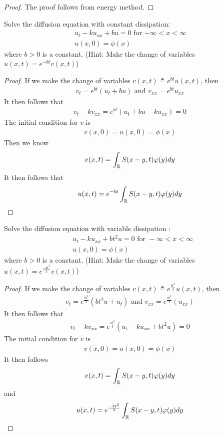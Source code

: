 \documentclass{report}
\begin{document}
\begin{proof}
The proof follows from energy method.
\end{proof}
\begin{question}{}{}
Solve the diffusion equation with constant dissipation: 
\begin{align*}
&u_t-ku_{xx}+bu=0\text{ for $-\infty < x< \infty$ } \\
&u(x,0)=\phi (x)
\end{align*}
where $b>0$ is a constant. (Hint: Make the change of variables $u(x,t)=e^{-bt}v(x,t)$)
\end{question}
\begin{proof}
If we make the change of variables $v(x,t)\triangleq e^{bt}u(x,t)$, then 
\begin{align*}
v_t=e^{bt}(u_t+bu)\text{ and }v_{xx}=e^{bt}u_{xx}
\end{align*}
It then follows that 
\begin{align*}
v_t-kv_{xx}=e^{bt}(u_t+bu-ku_{xx})=0 
\end{align*}
The initial condition for $v$ is 
\begin{align*}
v(x,0)=u(x,0)=\phi (x)
\end{align*}
Then we know 
\begin{align*}
v(x,t)= \int_{\mathbb{R}} S(x-y,t)\varphi (y)dy 
\end{align*}
It then follows that 
\begin{align*}
u(x,t)=e^{-bt}\int_{\mathbb{R}}S(x-y,t)\varphi (y)dy
\end{align*}
\end{proof}
\begin{question}{}{}
Solve the diffusion equation with variable dissipation : 
\begin{align*}
&u_t-ku_{xx}+bt^2 u=0\text{ for }-\infty < x< \infty \\
&u(x,0)=\phi (x)
\end{align*}
where $b>0$ is a constant.  (Hint: Make the change of variables $u(x,t)=e^{\frac{-bt^3}{3}}v(x,t)$)
\end{question}
\begin{proof}
If we make the change of variables $v(x,t)\triangleq e^{\frac{bt^3}{3}}u(x,t)$, then 
\begin{align*}
v_t= e^{\frac{bt^3}{3}}(bt^2u+ u_t)\text{ and }v_{xx}=e^{\frac{bt^3}{3}}(u_{xx})
\end{align*}
It then follows that 
\begin{align*}
v_t-kv_{xx}=e^{\frac{bt^3}{3}}(u_t-ku_{xx}+bt^2u)=0
\end{align*}
The initial condition for $v$ is 
 \begin{align*}
v(x,0)=u(x,0)=\phi (x)
\end{align*}
It then follows 
\begin{align*}
v(x,t)=\int_{\mathbb{R}} S(x-y,t)\varphi (y)dy
\end{align*}
and 
\begin{align*}
u(x,t)=e^{\frac{-bt^3}{3}} \int_{\mathbb{R}} S(x-y,t)\varphi (y)dy
\end{align*}
\end{proof}
\end{document}
